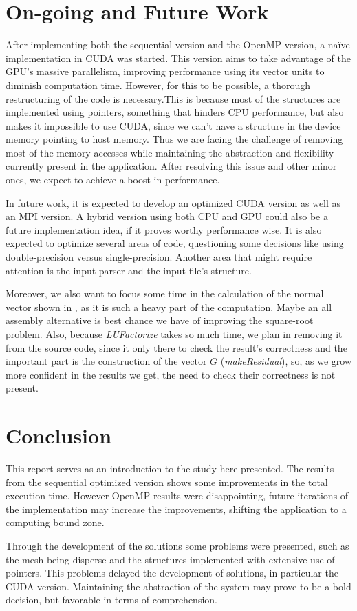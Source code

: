 \documentclass[a4paper,10pt,openright,openbib,twocolumn]{article}
\begin{document}
\section{On-going and Future Work}    %
\label{sec:futurework}
After implementing both the sequential version and the OpenMP version, a na\"{i}ve implementation in CUDA was started. This version aims to take advantage of the GPU's massive parallelism, improving performance using its vector units to diminish computation time. However, for this to be possible, a thorough restructuring of the code is necessary.This is because most of the structures are implemented using pointers, something that hinders CPU performance, but also makes it impossible to use CUDA, since we can't have a structure in the device memory pointing to host memory. Thus we are facing the challenge of removing most of the memory accesses while maintaining the abstraction and flexibility currently present in the application. After resolving this issue and other minor ones, we expect to achieve a boost in performance.

In future work, it is expected to develop an optimized CUDA version as well as an MPI version. A hybrid version using both CPU and GPU could also be a future implementation idea, if it proves worthy performance wise. It is also expected to optimize several areas of code, questioning some decisions like using double-precision versus single-precision. Another area that might require attention is the input parser and the input file's structure. 

Moreover, we also want to focus some time in the calculation of the normal vector shown in , as it is such a heavy part of the computation. Maybe an all assembly alternative is best chance we have of improving the square-root problem. Also, because \emph{LUFactorize} takes so much time, we plan in removing it from the source code, since it only there to check the result's correctness and the important part is the construction of the vector $G$ (\emph{makeResidual}), so, as we grow more confident in the results we get, the need to check their correctness is not present.

\section{Conclusion}
\label{sec:conclusion}
This report serves as an introduction to the study here presented. The results from the sequential optimized version shows some improvements in the total execution time.
However OpenMP results were disappointing, future iterations of the implementation may increase the improvements, shifting the application to a computing bound zone.

Through the development of the solutions some problems were presented, such as the mesh being disperse and the structures implemented with extensive use of pointers. This problems delayed the development of solutions, in particular the CUDA version. Maintaining the abstraction of the system may prove to be a bold decision, but favorable in terms of comprehension.
\end{document}
